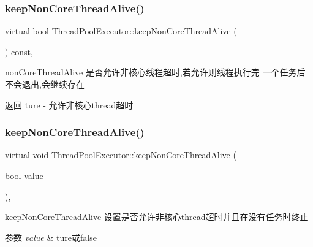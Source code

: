 \subsubsection{\texorpdfstring{keep\+Non\+Core\+Thread\+Alive()}{keepNonCoreThreadAlive()}\hspace{0.1cm}{\footnotesize\ttfamily [1/2]}}
{\footnotesize\ttfamily virtual bool Thread\+Pool\+Executor\+::keep\+Non\+Core\+Thread\+Alive (\begin{DoxyParamCaption}{ }\end{DoxyParamCaption}) const\hspace{0.3cm}{\ttfamily [final]}, {\ttfamily [virtual]}}



non\+Core\+Thread\+Alive 是否允许非核心线程超时,若允许则线程执行完 一个任务后不会退出,会继续存在 

\begin{DoxyReturn}{返回}
ture -\/ 允许非核心thread超时 
\end{DoxyReturn}
\mbox{\label{classThreadPoolExecutor_a7e6ed2d088147377d1e82018ac3dac1d}} 
\subsubsection{\texorpdfstring{keep\+Non\+Core\+Thread\+Alive()}{keepNonCoreThreadAlive()}\hspace{0.1cm}{\footnotesize\ttfamily [2/2]}}
{\footnotesize\ttfamily virtual void Thread\+Pool\+Executor\+::keep\+Non\+Core\+Thread\+Alive (\begin{DoxyParamCaption}\item[{bool}]{value }\end{DoxyParamCaption})\hspace{0.3cm}{\ttfamily [final]}, {\ttfamily [virtual]}}



keep\+Non\+Core\+Thread\+Alive 设置是否允许非核心thread超时并且在没有任务时终止 


\begin{DoxyParams}{参数}
{\em value} & ture或false \\
\hline
\end{DoxyParams}
\mbox{\label{classThreadPoolExecutor_aab8b3946a87fbecd144b159c12c8bcfb}} 
